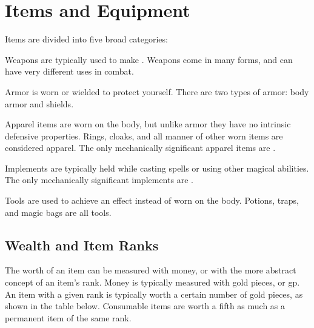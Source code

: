 \chapter{Items and Equipment}\label{Items and Equipment}

Items are divided into five broad categories:
\begin{raggeditemize}
  \item Weapons are typically used to make .
    Weapons come in many forms, and can have very different uses in combat.
  \item Armor is worn or wielded to protect yourself.
    There are two types of armor: body armor and shields.
  \item Apparel items are worn on the body, but unlike armor they have no intrinsic defensive properties.
    Rings, cloaks, and all manner of other worn items are considered apparel.
    The only mechanically significant apparel items are \magical.
  \item Implements are typically held while casting spells or using other magical abilities.
    The only mechanically significant implements are \magical.
  \item Tools are used to achieve an effect instead of worn on the body.
    Potions, traps, and magic bags are all tools.
\end{raggeditemize}

\section{Wealth and Item Ranks}\label{Wealth}\label{Wealth and Item Ranks}
  The worth of an item can be measured with money, or with the more abstract concept of an item's rank.
  Money is typically measured with gold pieces, or gp.
  An item with a given rank is typically worth a certain number of gold pieces, as shown in the table below.
  Consumable items are worth a fifth as much as a permanent item of the same rank.

